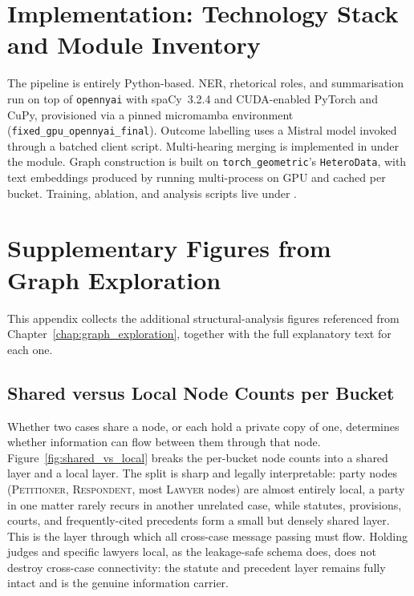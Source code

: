 \appendix

\chapter{Implementation: Technology Stack and Module Inventory}
\label{app:tech_stack}

The pipeline is entirely Python-based. NER, rhetorical roles, and
summarisation run on top of \texttt{opennyai} with spaCy~3.2.4 and
CUDA-enabled PyTorch and CuPy, provisioned via a pinned micromamba
environment (\texttt{fixed\_gpu\_opennyai\_final}). Outcome labelling
uses a Mistral model invoked through a batched client script.
Multi-hearing merging is implemented in
 under the  module.
Graph construction is built on \texttt{torch\_geometric}'s
\texttt{HeteroData}, with text embeddings produced by
 running multi-process on GPU and cached per
bucket. Training, ablation, and analysis scripts live under
.

\chapter{Supplementary Figures from Graph Exploration}
\label{app:graph_exploration}

This appendix collects the additional structural-analysis figures
referenced from Chapter~\ref{chap:graph_exploration}, together with
the full explanatory text for each one.

\section{Shared versus Local Node Counts per Bucket}
\label{app:shared_vs_local}

Whether two cases share a node, or each hold a private copy of one,
determines whether information can flow between them through that
node. Figure~\ref{fig:shared_vs_local} breaks the per-bucket node
counts into a shared layer and a local layer. The split is sharp and
legally interpretable: party nodes (\textsc{Petitioner},
\textsc{Respondent}, most \textsc{Lawyer} nodes) are almost entirely
local, a party in one matter rarely recurs in another unrelated
case, while statutes, provisions, courts, and frequently-cited
precedents form a small but densely shared layer. This is the layer
through which all cross-case message passing must flow. Holding
judges and specific lawyers local, as the leakage-safe schema does,
does not destroy cross-case connectivity: the statute and precedent
layer remains fully intact and is the genuine information carrier.

